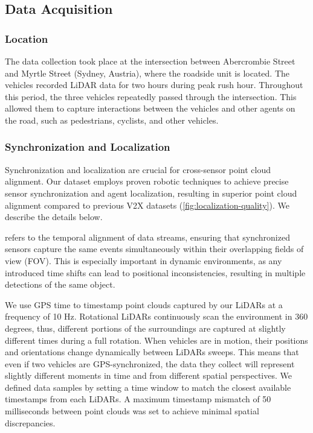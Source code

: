 \subsection{Data Acquisition}

\subsubsection{Location}
The data collection took place at the 
intersection between Abercrombie Street and Myrtle Street (Sydney, Austria),
where the roadside unit is located. The vehicles recorded LiDAR data for two hours during peak rush hour. Throughout this period, the three vehicles repeatedly passed through the intersection. This allowed them to capture interactions between the vehicles and other agents on the road, such as pedestrians, cyclists, and other vehicles. 

\subsubsection{Synchronization and Localization}

Synchronization and localization are crucial for cross-sensor point cloud alignment. Our dataset employs proven robotic techniques to achieve precise sensor synchronization and agent localization, resulting in superior point cloud alignment compared to previous V2X datasets (\autoref{fig:localization-quality}). We describe the details below.


 refers to the temporal alignment of data streams, ensuring that synchronized sensors capture the same events simultaneously within their overlapping fields of view (FOV). 
This is especially important in dynamic environments, as any introduced time shifts can lead to positional inconsistencies, resulting in multiple detections of the same object.


We use GPS time to timestamp point clouds captured by our LiDARs at a frequency of 10 Hz.
Rotational LiDARs continuously scan the environment in 360 degrees, thus, different portions of the surroundings are captured at slightly different times during a full rotation. When vehicles are in motion, their positions and orientations change dynamically between LiDARs sweeps. This means that even if two vehicles are GPS-synchronized, the data they collect will represent slightly different moments in time and from different spatial perspectives.
We defined data samples by setting a time window to match the closest available timestamps from each LiDARs. A maximum timestamp mismatch of 50 milliseconds between point clouds was set to achieve minimal spatial discrepancies. 


